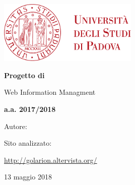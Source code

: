 \begin{titlepage} 
	\centering
	\includegraphics[width=0.50\textwidth]{img/logo.pdf}\par\vspace{1cm} %
	
	{\LARGE\bfseries Progetto di \par Web Information Managment \par}
	\vspace{1cm}
	
	{\Large\bfseries a.a. 2017/2018 \par}
	
	\vspace{1cm} 

	Autore: \par
	{\bfseries \authorName \par} 
	
	\vspace{1cm}


    Sito analizzato: \par
	\url{http://golarion.altervista.org/}

    \vfill
	
	{\large 13 maggio 2018 \par}
	
\end{titlepage}